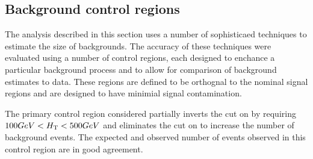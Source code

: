 

\subsection{Background control regions}

The analysis described in this section uses a number of sophisticaed techniques to estimate the size of backgrounds.
The accuracy of these techniques were evaluated using a number of control regions, each designed to enchance a particular background process and to allow for comparison of background estimates to data.
These regions are defined to be orthognal to the nominal signal regions and are designed to have minimial signal contamination.


The primary control region considered partially inverts the cut on \HT{} by requiring $100 GeV < H_{\mathrm{T}}{} < 500 GeV$ and eliminates the cut on \met{} to increase the number of background events.
The expected and observed number of events observed in this control region are in good agreement.

